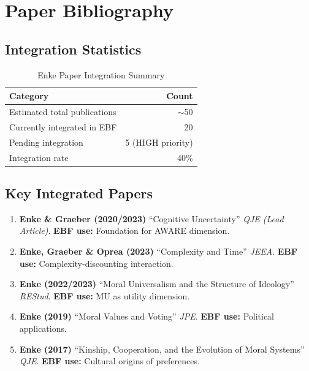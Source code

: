 \section{Paper Bibliography}
\label{sec:enk-papers}

\subsection{Integration Statistics}

\begin{table}[htbp]
\centering
\caption{Enke Paper Integration Summary}
\label{tab:enk-integration}
\begin{tabular}{@{}lr@{}}
\toprule
\textbf{Category} & \textbf{Count} \\
\midrule
Estimated total publications & $\sim$50 \\
Currently integrated in EBF & 20 \\
Pending integration & 5 (HIGH priority) \\
Integration rate & 40\% \\
\bottomrule
\end{tabular}
\end{table}

\subsection{Key Integrated Papers}

\begin{enumerate}
    \item \textbf{Enke \& Graeber (2020/2023)} ``Cognitive Uncertainty''
          \textit{QJE (Lead Article)}. \textbf{EBF use:} Foundation for AWARE dimension.

    \item \textbf{Enke, Graeber \& Oprea (2023)} ``Complexity and Time''
          \textit{JEEA}. \textbf{EBF use:} Complexity-discounting interaction.

    \item \textbf{Enke (2022/2023)} ``Moral Universalism and the Structure of Ideology''
          \textit{REStud}. \textbf{EBF use:} MU as utility dimension.

    \item \textbf{Enke (2019)} ``Moral Values and Voting''
          \textit{JPE}. \textbf{EBF use:} Political applications.

    \item \textbf{Enke (2017)} ``Kinship, Cooperation, and the Evolution of Moral Systems''
          \textit{QJE}. \textbf{EBF use:} Cultural origins of preferences.
\end{enumerate}

